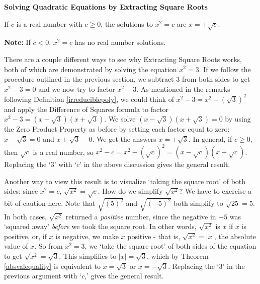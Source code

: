 \documentclass{ximera}
\begin{document}
\colorbox{ResultColor}{\bbm

\centerline{\textbf{Solving Quadratic Equations by Extracting Square Roots}}
\vspace{.05in}
If $c$ is a real number with $c \geq 0$, the solutions to $x^2 = c$ are $x = \pm \sqrt{c}$.

\vspace{.05in}
\textbf{Note:}  If $c < 0$, $x^2 = c$ has no real number solutions.

\ebm}

\medskip

There are a couple different ways to see why Extracting Square Roots works, both of which are demonstrated by solving the equation $x^2 = 3$.  If we follow the procedure outlined in the previous section, we subtract $3$ from both sides to get $x^2 - 3 = 0$ and we now try to factor $x^2 - 3$.   As mentioned in the remarks following Definition \ref{irreduciblepoly}, we could think of $x^2 - 3 = x^2 - (\sqrt{3})^2$ and apply the Difference of Squares formula to factor $x^2 - 3 = (x-\sqrt{3})(x+\sqrt{3})$.  We solve $(x-\sqrt{3})(x+\sqrt{3}) = 0$ by using the Zero Product Property as before by setting each factor equal to zero:  $x - \sqrt{3} = 0$ and $x+\sqrt{3} - 0$.  We get the answers $x = \pm \sqrt{3}$.  In general,  if $c \geq 0$, then $\sqrt{c}$ is a real number, so  $x^2 - c = x^2 - (\sqrt{c})^2 = (x-\sqrt{c})(x+\sqrt{c})$.  Replacing the `$3$' with `$c$' in the above discussion gives the general result. 

\smallskip

Another way to view this result is to visualize  `taking the square root' of both sides:   since $x^2 = c$,  $\sqrt{x^2} = \sqrt{c}$.  How do we simplify $\sqrt{x^2}$? We have to exercise a bit of caution here.  Note that $\sqrt{(5)^2}$ and $\sqrt{(-5)^2}$ both simplify to  $\sqrt{25} = 5$.  In both cases, $\sqrt{x^2}$ returned a \textit{positive} number, since the negative in $-5$ was `squared away' \textit{before} we took the square root.  In other words, $\sqrt{x^2}$ is $x$ if $x$ is positive, or, if $x$ is negative, we make $x$ positive - that is, $\sqrt{x^2} = |x|$, the absolute value of $x$.  So from $x^2 = 3$, we `take the square root' of both sides of the equation to get $\sqrt{x^2} = \sqrt{3}$.  This simplifies to $|x| = \sqrt{3}$, which by Theorem \ref{absvalequality} is equivalent to $x = \sqrt{3}$ or $x = -\sqrt{3}$.  Replacing the `$3$' in the previous argument with `$c$,' gives the general result.

\smallskip
\end{document}
